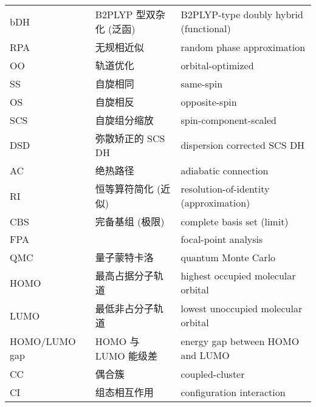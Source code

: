 \begin{longtable}{lll}
    bDH & B2PLYP 型双杂化 (泛函) & B2PLYP-type doubly hybrid (functional) \\
    RPA & 无规相近似 & random phase approximation \\
    OO & 轨道优化 & orbital-optimized \\
    SS & 自旋相同 & same-spin \\
    OS & 自旋相反 & opposite-spin \\
    SCS & 自旋组分缩放 & spin-component-scaled \\
    DSD & 弥散矫正的 SCS DH & dispersion corrected SCS DH \\
    AC & 绝热路径 & adiabatic connection \\
    RI & 恒等算符简化 (近似) & resolution-of-identity (approximation) \\
    CBS & 完备基组 (极限) & complete basis set (limit) \\
    FPA & & focal-point analysis \\
    QMC & 量子蒙特卡洛 & quantum Monte Carlo \\
    HOMO & 最高占据分子轨道 & highest occupied molecular orbital \\
    LUMO & 最低非占分子轨道 & lowest unoccupied molecular orbital \\
    HOMO/LUMO gap & HOMO 与 LUMO 能级差 & energy gap between HOMO and LUMO \\
    CC & 偶合簇 & coupled-cluster \\
    CI & 组态相互作用 & configuration interaction \\
\end{longtable}

\endgroup
